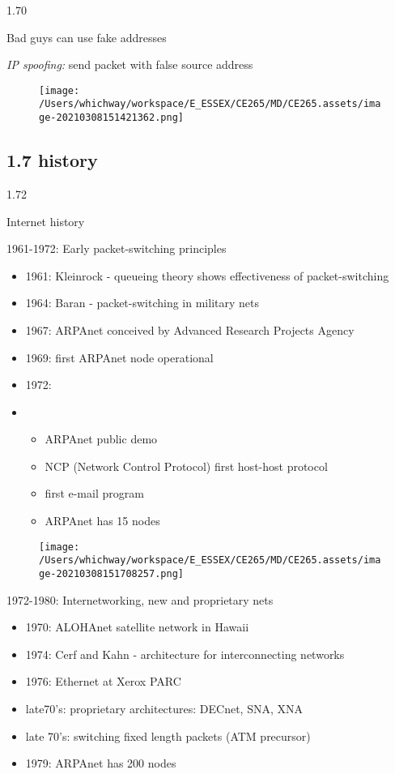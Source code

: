 \documentclass[
]{article}
\begin{document}
1.70

Bad guys can use fake addresses

\emph{IP spoofing:} send packet with false source address

\begin{figure}
\centering
\texttt{[image: /Users/whichway/workspace/E\_ESSEX/CE265/MD/CE265.assets/image-20210308151421362.png]}
\caption{}
\end{figure}

\hypertarget{17-history}{%
\subsection{1.7 history}\label{17-history}}

1.72

Internet history

1961-1972: Early packet-switching principles

\begin{itemize}
\item
  1961: Kleinrock - queueing theory shows effectiveness of
  packet-switching
\item
  1964: Baran - packet-switching in military nets
\item
  1967: ARPAnet conceived by Advanced Research Projects Agency
\item
  1969: first ARPAnet node operational
\item
  1972:
\item
  \begin{itemize}
  \item
    ARPAnet public demo
  \item
    NCP (Network Control Protocol) first host-host protocol
  \item
    first e-mail program
  \item
    ARPAnet has 15 nodes
  \end{itemize}
\end{itemize}

\begin{figure}
\centering
\texttt{[image: /Users/whichway/workspace/E\_ESSEX/CE265/MD/CE265.assets/image-20210308151708257.png]}
\caption{}
\end{figure}

1972-1980: Internetworking, new and proprietary nets

\begin{itemize}
\item
  1970: ALOHAnet satellite network in Hawaii
\item
  1974: Cerf and Kahn - architecture for interconnecting networks
\item
  1976: Ethernet at Xerox PARC
\item
  late70's: proprietary architectures: DECnet, SNA, XNA
\item
  late 70's: switching fixed length packets (ATM precursor)
\item
  1979: ARPAnet has 200 nodes
\end{itemize}
\end{document}
